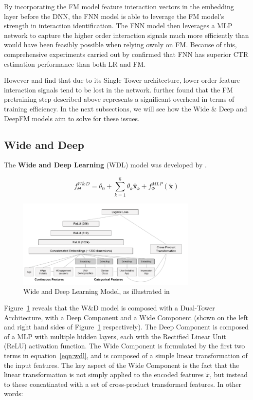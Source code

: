 \documentclass{mldsmsc}
\begin{document}
By incorporating the FM model feature interaction vectors in the embedding layer
before the DNN, the FNN model is able to leverage the FM model's strength in
interaction identification. The FNN model then leverages a MLP network
to capture the higher order interaction signals much more efficiently than would
have been feasibly possible when relying ownly on FM. Because of this, comprehensive
experiments carried out by \cite{RefWorks:zhang2016deep} confirmed that FNN
has superior CTR estimation performance than both LR and FM.

However \cite{RefWorks:guo2017deepfm:} and \cite{RefWorks:zhang2021deep} find that
due to its Single Tower architecture, lower-order feature interaction signals tend
to be lost in the network. \cite{RefWorks:guo2017deepfm:} further found that
the FM pretraining step described above represents a significant overhead in
terms of training efficiency. In the next subsections, we will see how the Wide \& Deep
and DeepFM models aim to solve for these issues.

\subsection{Wide and Deep}

The \textbf{Wide and Deep Learning} (WDL) model was developed by \cite{RefWorks:cheng2016wide}.

\begin{equation}
    \label{eqn:wdl}
    f_{\Theta}^{W\&D} = \theta_0 + \sum_{k=1}^{\hat{n}} \theta_k \hat{\mathbf{x}}_k
    + f_{\Phi}^{MLP}(\tilde{\mathbf{x}})
\end{equation}

\begin{figure}[h]
\centering
\includegraphics[width = 0.8\textwidth]{../figures/wdl.png}
\caption{Wide and Deep Learning Model, as illustrated in \citep{RefWorks:shen2017deepctr:}}
\label{fig:wdl}
\end{figure}

Figure~\ref{fig:wdl} reveals that the W\&D model is composed with a Dual-Tower Architecture,
with a Deep Component and a Wide Component (shown on the left and right hand sides of Figure~\ref{fig:wdl}
respectively). The Deep Component is composed of a MLP with multiple hidden layers, each
with the Rectified Linear Unit (ReLU) activation function. The Wide Component is formulated
by the first two terms in equation~\ref{eqn:wdl}, and is composed of a simple linear transformation
of the input features. The key aspect of the Wide Component is the fact that the 
linear transformation is not simply applied to the encoded features $\tilde{x}$,
but instead to these concatinated with a set of cross-product transformed features. In
other words:
\end{document}
